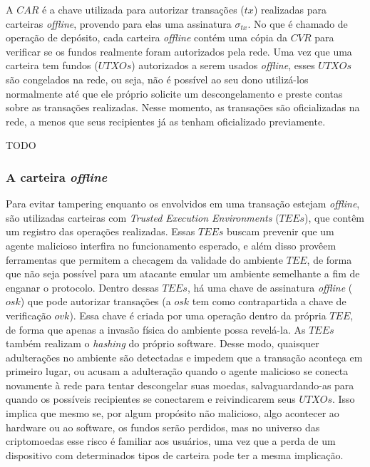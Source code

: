 \documentclass[
  12pt,
  a4paper,
  oneside,
  article,
]{abntex2}
\begin{document}
A $CAR$ é a chave utilizada para autorizar transações ($tx$) realizadas para carteiras \textit{offline}, provendo para elas uma assinatura $\sigma_{tx}$. No que é chamado de operação de depósito, cada carteira \textit{offline} contém uma cópia da $CVR$ para verificar se os fundos realmente foram autorizados pela rede. Uma vez que uma carteira tem fundos ($UTXOs$) autorizados a serem usados \textit{offline}, esses $UTXOs$ são congelados na rede, ou seja, não é possível ao seu dono utilizá-los normalmente até que ele próprio solicite um descongelamento e preste contas sobre as transações realizadas. Nesse momento, as transações são oficializadas na rede, a menos que seus recipientes já as tenham oficializado previamente.


TODO

\subsubsection{A carteira \textit{offline}}

Para evitar tampering enquanto os envolvidos em uma transação estejam \textit{offline}, são utilizadas carteiras com \textit{Trusted Execution Environments} ($TEEs$), que contêm um registro das operações realizadas. Essas $TEEs$ buscam prevenir que um agente malicioso interfira no funcionamento esperado, e além disso provêem ferramentas que permitem a checagem da validade do ambiente $TEE$, de forma que não seja possível para um atacante emular um ambiente semelhante a fim de enganar o protocolo. Dentro dessas $TEEs$, há uma chave de assinatura \textit{offline} ($osk$) que pode autorizar transações (a $osk$ tem como contrapartida a chave de verificação $ovk$). Essa chave é criada por uma operação dentro da própria $TEE$, de forma que apenas a invasão física do ambiente possa revelá-la. As $TEEs$ também realizam o \textit{hashing} do próprio software. Desse modo, quaisquer adulterações no ambiente são detectadas e impedem que a transação aconteça em primeiro lugar, ou acusam a adulteração quando o agente malicioso se conecta novamente à rede para tentar descongelar suas moedas, salvaguardando-as para quando os possíveis recipientes se conectarem e reivindicarem seus $UTXOs$. Isso implica que mesmo se, por algum propósito não malicioso, algo acontecer ao hardware ou ao software, os fundos serão perdidos, mas no universo das criptomoedas esse risco é familiar aos usuários, uma vez que a perda de um dispositivo com determinados tipos de carteira pode ter a mesma implicação.
\end{document}

